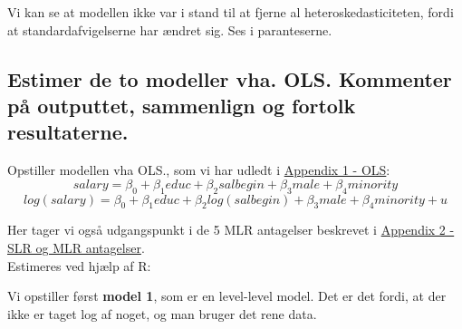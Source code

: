 \documentclass[
  10pt,
]{article}
\begin{document}
Vi kan se at modellen ikke var i stand til at fjerne al
heteroskedasticiteten, fordi at standardafvigelserne har ændret sig. Ses
i paranteserne.

\newpage



\hypertarget{estimer-de-to-modeller-vha.-ols.-kommenter-puxe5-outputtet-sammenlign-og-fortolk-resultaterne.}{%
\subsection{Estimer de to modeller vha. OLS. Kommenter på outputtet,
sammenlign og fortolk
resultaterne.}\label{estimer-de-to-modeller-vha.-ols.-kommenter-puxe5-outputtet-sammenlign-og-fortolk-resultaterne.}}

\leavevmode

Opstiller modellen vha OLS., som vi har udledt i
\hyperref[sec:OLS]{Appendix 1 - OLS}:
\[salary = \beta_0+\beta_1educ+\beta_2salbegin+\beta_3male+\beta_4minority \tag{1}\]
\[ log(salary)=\beta_0+\beta_1educ+\beta_2log(salbegin)+\beta_3male+\beta_4minority+u \tag{2} \]

Her tager vi også udgangspunkt i de 5 MLR antagelser beskrevet i
\hyperref[sec:SLR]{Appendix 2 - SLR og MLR antagelser}.\\
\newline Estimeres ved hjælp af R:

Vi opstiller først \textbf{model 1}, som er en level-level model. Det er
det fordi, at der ikke er taget log af noget, og man bruger det rene
data.
\end{document}

